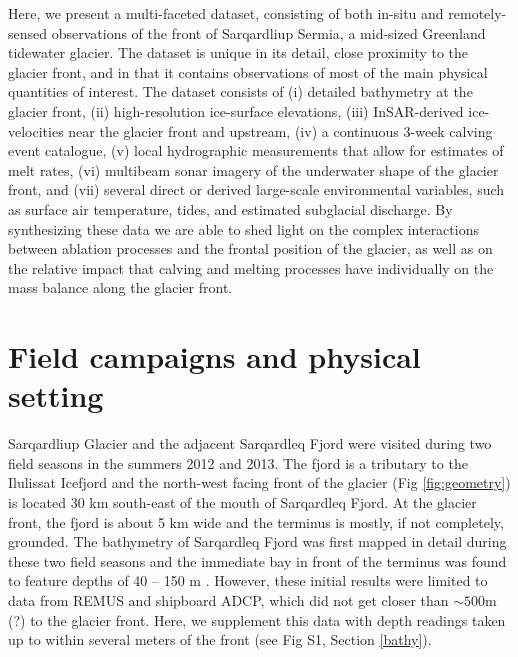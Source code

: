 \documentclass[10pt,letterpaper]{article}
\begin{document}
Here, we present a multi-faceted dataset, consisting of both in-situ and remotely-sensed observations of the front of Sarqardliup Sermia, a mid-sized Greenland tidewater glacier. The dataset is unique in its detail, close proximity to the glacier front, and in that it contains observations of most of the main physical quantities of interest. The dataset consists of (i) detailed bathymetry at the glacier front, (ii) high-resolution ice-surface elevations, (iii) InSAR-derived ice-velocities near the glacier front and upstream, (iv) a continuous 3-week calving event catalogue, (v) local hydrographic measurements that allow for estimates of melt rates, (vi) multibeam sonar imagery of the underwater shape of the glacier front, and (vii) several direct or derived large-scale environmental variables, such as surface air temperature, tides, and estimated subglacial discharge. By synthesizing these data we are able to shed light on the complex interactions between ablation processes and the frontal position of the glacier, as well as on the relative impact that calving and melting processes have individually on the mass balance along the glacier front. 



\section{Field campaigns and physical setting}

Sarqardliup Glacier and the adjacent Sarqardleq Fjord were visited during two field seasons in the summers 2012 and 2013. The fjord is a tributary to the Ilulissat Icefjord and the north-west facing front of the glacier (Fig \ref{fig:geometry}) is located 30 km south-east of the mouth of Sarqardleq Fjord. At the glacier front, the fjord is about 5 km wide and the terminus is mostly, if not completely, grounded. The bathymetry of Sarqardleq Fjord was first mapped in detail during these two field seasons and the immediate bay in front of the terminus was found to feature depths of 40 -- 150 m \citep{Stevens:2016tx}. However, these initial results were limited to data from REMUS and shipboard ADCP, which did not get closer than $\sim 500$m (?) to the glacier front. Here, we supplement this data with depth readings taken up to within several meters of the front (see Fig S1, Section \ref{bathy}). 
\end{document}
